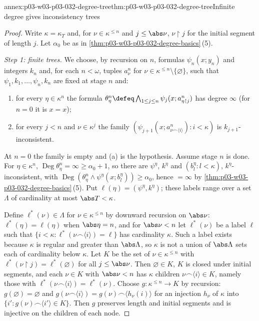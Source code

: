 \begin{annexitem}{annex:p03-w03-p03-032-degree-tree}{thm:p03-w03-p03-032-degree-tree}{Infinite degree gives inconsistency trees}
\begin{proof}
Write \(\kappa=\kappa_T\) and, for \(\nu\in\kappa^{\leq n}\) and
\(j\leq\abs\nu\), \(\nu\mathbin{\upharpoonright}j\) for the initial segment of
length \(j\).  Let \(\alpha_0\) be as in
\cref{thm:p03-w03-p03-032-degree-basics}\,(5).

\emph{Step 1: finite trees.}  We choose, by recursion on \(n\), formulas
\(\psi_n(x;y_n)\) and integers \(k_n\) and, for each \(n<\omega\), tuples
\(a^n_\nu\) for \(\nu\in\kappa^{\leq n}\setminus\{\varnothing\}\), such that
\(\psi_1,k_1,\ldots,\psi_n,k_n\) are fixed at stage \(n\) and:
\begin{enumerate}
  \item[(a)] for every \(\eta\in\kappa^n\) the formula
        \(\theta^n_\eta\defeq\bigwedge_{1\leq j\leq n}
        \psi_j(x;a^n_{\eta\mathbin{\upharpoonright}j})\) has degree
        \(\infty\) (for \(n=0\) it is \(x=x\));
  \item[(b)] for every \(j<n\) and \(\nu\in\kappa^j\) the family
        \((\psi_{j+1}(x;a^n_{\nu\frown\langle i\rangle}):i<\kappa)\) is
        \(k_{j+1}\)-inconsistent.
\end{enumerate}
At \(n=0\) the family is empty and (a) is the hypothesis.  Assume stage
\(n\) is done.  For \(\eta\in\kappa^n\),
\(\operatorname{Deg}\theta^n_\eta=\infty\geq\alpha_0+1\), so there are
\(\psi^\eta\), \(k^\eta\) and \((b^\eta_l:l<\kappa)\), \(k^\eta\)-inconsistent,
with \(\operatorname{Deg}(\theta^n_\eta\wedge\psi^\eta(x;b^\eta_l))\geq
\alpha_0\), hence \(=\infty\) by
\cref{thm:p03-w03-p03-032-degree-basics}\,(5).  Put
\(\ell(\eta)=(\psi^\eta,k^\eta)\); these labels range over a set \(\Lambda\) of
cardinality at most \(\abs T<\kappa\).

Define \(\ell^*(\nu)\in\Lambda\) for \(\nu\in\kappa^{\leq n}\) by downward
recursion on \(\abs\nu\): \(\ell^*(\eta)=\ell(\eta)\) when \(\abs\eta=n\),
and for \(\abs\nu<n\) let \(\ell^*(\nu)\) be a label \(\ell\) such that
\(\{i<\kappa:\ell^*(\nu\frown\langle i\rangle)=\ell\}\) has cardinality
\(\kappa\).  Such a label exists because \(\kappa\) is regular and greater
than \(\abs\Lambda\), so \(\kappa\) is not a union of \(\abs\Lambda\) sets
each of cardinality below \(\kappa\).  Let \(K\) be the set of
\(\nu\in\kappa^{\leq n}\) with \(\ell^*(\nu\mathbin{\upharpoonright}j)=
\ell^*(\varnothing)\) for all \(j\leq\abs\nu\).  Then \(\varnothing\in K\),
\(K\) is closed under initial segments, and each \(\nu\in K\) with
\(\abs\nu<n\) has \(\kappa\) children
\(\nu\frown\langle i\rangle\in K\), namely those with
\(\ell^*(\nu\frown\langle i\rangle)=\ell^*(\nu)\).  Choose
\(g:\kappa^{\leq n}\to K\) by recursion: \(g(\varnothing)=\varnothing\) and
\(g(\nu\frown\langle i\rangle)=g(\nu)\frown\langle h_\nu(i)\rangle\) for an
injection \(h_\nu\) of \(\kappa\) into
\(\{i':g(\nu)\frown\langle i'\rangle\in K\}\).  Then \(g\) preserves length
and initial segments and is injective on the children of each node.


\end{proof}
\end{annexitem}
